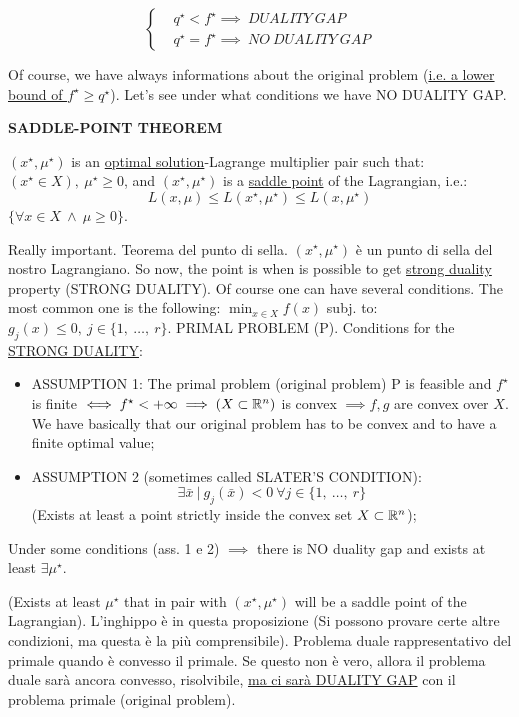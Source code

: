 \[
	\left\{
	\begin{aligned}
	&q^\star < f^\star \implies\ DUALITY\ GAP\\
	&q^\star = f^\star \implies\ NO\ DUALITY\ GAP
	\end{aligned}
	\right.
\]

Of course, we have always informations about the original problem \newline (\underline{i.e. a lower bound of $f^\star\geq q^\star$}).
Let's see under what conditions we have NO DUALITY GAP.

\begin{prop}{\textbf{SADDLE-POINT THEOREM}}

$(x^\star,\mu^\star)$ is an \underline{optimal solution}-Lagrange multiplier pair such that: $(x^\star\in X),\ \mu^\star\geq 0$, and $(x^\star,\mu^\star)$ is a \underline{saddle point} of the Lagrangian, i.e.:
\[
	L(x,\mu) \leq L(x^\star,\mu^\star) \leq L(x,\mu^\star)
\]
$\{\forall x\in X\ \land\ \mu\geq 0\}$.
\end{prop}

Really important. Teorema del punto di sella. $(x^\star,\mu^\star)$ è un punto di sella del nostro Lagrangiano. So now, the point is when is possible to get \underline{strong duality} property (STRONG DUALITY). Of course one can have several conditions. The most common one is the following:
$\min_{x\in X}{f(x)}$ subj. to: $g_j(x)\leq 0,\ j\in\{1,\ \dots,\ r\}$. PRIMAL PROBLEM (P). Conditions for the \underline{STRONG DUALITY}:
\begin{itemize}
\item{ASSUMPTION 1}: The primal problem (original problem) P is feasible and $f^\star$ is finite $\iff f^\star<+\infty \implies (X\subset\mathbb{R}^n)$ is convex $\implies f,g$ are convex over $X$. We have basically that our original problem has to be convex and to have a finite optimal value;
\item{ASSUMPTION 2 (sometimes called SLATER'S CONDITION)}:
\[
	\exists\bar{x}\ |\ g_j(\bar{x}) < 0\ \forall j\in\{1,\ \dots,\ r\}
\]
(Exists at least a point strictly inside the convex set $X\subset\mathbb{R}^n$);
\end{itemize}

\begin{prop}

Under some conditions (ass. 1 e 2) $\implies$ there is NO duality gap and exists at least $\exists\mu^\star$.
\end{prop}

(Exists at least $\mu^\star$ that in pair with $(x^\star,\mu^\star)$ will be a saddle point of the Lagrangian).
L'inghippo è in questa proposizione (Si possono provare certe altre condizioni, ma questa è la più comprensibile). Problema duale rappresentativo del primale quando è convesso il primale. Se questo non è vero, allora il problema duale sarà ancora convesso, risolvibile, \underline{ma ci sarà DUALITY GAP} con il problema primale (original problem).

